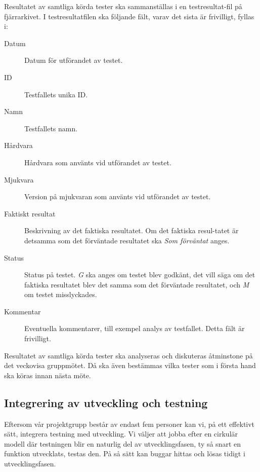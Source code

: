 \documentclass[a4paper]{article}
\begin{document}
Resultatet av samtliga körda tester ska sammanställas i en testresultat-fil på fjärrarkivet. I testresultatfilen ska följande fält, varav det sista är frivilligt, fyllas i:

\begin{description}
  \item [Datum] Datum för utförandet av testet.
  \item [ID] Testfallets unika ID.
  \item [Namn] Testfallets namn.
  \item [Hårdvara] Hårdvara som använts vid utförandet av testet.
  \item [Mjukvara] Version på mjukvaran som använts vid utförandet av testet.
  \item [Faktiskt resultat] Beskrivning av det faktiska resultatet. Om det faktiska resul-tatet är detsamma som det förväntade resultatet ska \textit{Som förväntat} anges.
  \item [Status] Status på testet. \textit{G} ska anges om testet blev godkänt, det vill säga om det faktiska resultatet blev det samma som det förväntade resultatet, och \textit{M} om testet misslyckades.
  \item [Kommentar] Eventuella kommentarer, till exempel analys av testfallet. Detta fält är frivilligt.
\end{description}

Resultatet av samtliga körda tester ska analyseras och diskuteras åtminstone på det veckovisa gruppmötet. Då ska även bestämmas vilka tester som i första hand ska köras innan nästa möte.

\subsection*{Integrering av utveckling och testning}

Eftersom vår projektgrupp består av endast fem personer kan vi, på ett effektivt sätt, integrera testning med utveckling. Vi väljer att jobba efter en cirkulär modell där testningen blir en naturlig del av utvecklingsfasen, ty så snart en funktion utvecklats, testas den. På så sätt kan buggar hittas och lösas tidigt i utvecklingsfasen.
\end{document}
